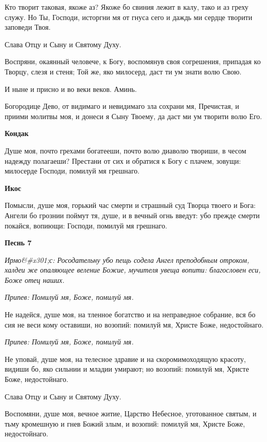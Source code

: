 Кто творит таковая, якоже аз? Якоже бо свиния лежит в калу, тако и аз греху служу. Но Ты, Господи, исторгни мя от гнуса сего и даждь ми сердце творити заповеди Твоя.


Слава Отцу и Сыну и Святому Духу.


Воспряни, окаянный человече, к Богу, воспомянув своя согрешения, припадая ко Творцу, слезя и стеня; Той же, яко милосерд, даст ти ум знати волю Свою.


И ныне и присно и во веки веков. Аминь.


Богородице Дево, от видимаго и невидимаго зла сохрани мя, Пречистая, и приими молитвы моя, и донеси я Сыну Твоему, да даст ми ум творити волю Его.




\bfseries Кондак\normalfont{}


Душе моя, почто грехами богатееши, почто волю диаволю твориши, в чесом надежду полагаеши? Престани от сих и обратися к Богу с плачем, зовущи: милосерде Господи, помилуй мя грешнаго.




\bfseries Икос\normalfont{}


Помысли, душе моя, горький час смерти и страшный суд Творца твоего и Бога: Ангели бо грознии поймут тя, душе, и в вечный огнь введут: убо прежде смерти покайся, вопиющи: Господи, помилуй мя грешнаго.




\bfseries Песнь 7\normalfont{}


\itshape Ирмо&#x301;с:\normalfont{} Росодательну убо пещь содела Ангел преподобным отроком, халдеи же опаляющее веление Божие, мучителя увеща вопити: благословен еси, Боже отец наших.


\itshape Припев:\normalfont{} Помилуй мя, Боже, помилуй мя.


Не надейся, душе моя, на тленное богатство и на неправедное собрание, вся бо сия не веси кому оставиши, но возопий: помилуй мя, Христе Боже, недостойнаго.


\itshape Припев:\normalfont{} Помилуй мя, Боже, помилуй мя.


Не уповай, душе моя, на телесное здравие и на скоромимоходящую красоту, видиши бо, яко сильнии и младии умирают; но возопий: помилуй мя, Христе Боже, недостойнаго.


Слава Отцу и Сыну и Святому Духу.


Воспомяни, душе моя, вечное житие, Царство Небесное, уготованное святым, и тьму кромешную и гнев Божий злым, и возопий: помилуй мя, Христе Боже, недостойнаго.


